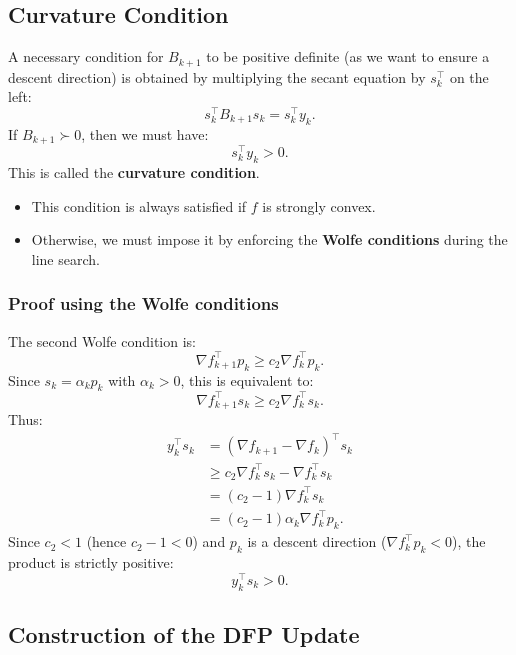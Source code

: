 \subsection{Curvature Condition}

A necessary condition for $B_{k+1}$ to be positive definite (as we want to ensure a descent direction) is obtained by multiplying the secant equation by $s_k^\top$ on the left:
\[
    s_k^\top B_{k+1} s_k = s_k^\top y_k.
\]
If $B_{k+1} \succ 0$, then we must have:
\begin{equation}
    s_k^\top y_k > 0.
\end{equation}
This is called the \textbf{curvature condition}.

\begin{itemize}
    \item This condition is always satisfied if $f$ is strongly convex.
    \item Otherwise, we must impose it by enforcing the \textbf{Wolfe conditions} during the line search.
\end{itemize}

\subsubsection{Proof using the Wolfe conditions}

The second Wolfe condition is:
\begin{equation}
    \nabla f_{k+1}^\top p_k \ge c_2 \nabla f_k^\top p_k.
\end{equation}
Since $s_k = \alpha_k p_k$ with $\alpha_k > 0$, this is equivalent to:
\[
    \nabla f_{k+1}^\top s_k \ge c_2 \nabla f_k^\top s_k.
\]
Thus:
\begin{align*}
    y_k^\top s_k
    &= (\nabla f_{k+1} - \nabla f_k)^\top s_k \\
    &\ge c_2 \nabla f_k^\top s_k - \nabla f_k^\top s_k \\
    &= (c_2 - 1) \nabla f_k^\top s_k \\
    &= (c_2 - 1) \alpha_k \nabla f_k^\top p_k.
\end{align*}
Since $c_2 < 1$ (hence $c_2 - 1 < 0$) and $p_k$ is a descent direction ($\nabla f_k^\top p_k < 0$), the product is strictly positive:
\[
    y_k^\top s_k > 0.
\]

\subsection{Construction of the DFP Update}

